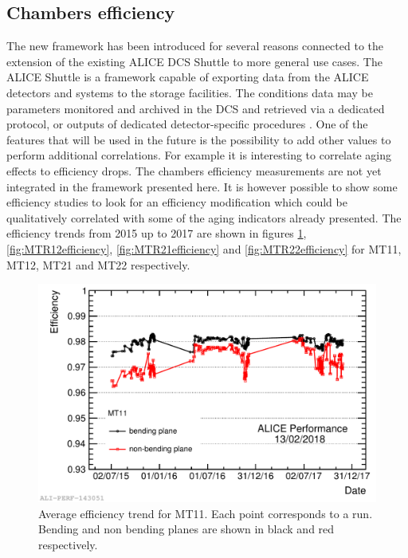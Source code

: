 \subsection{Chambers efficiency}
The new framework has been introduced for several reasons connected to the extension of the existing ALICE DCS Shuttle to more general use cases.
The ALICE Shuttle is a framework capable of exporting data from the ALICE detectors and systems to the storage facilities.
The conditions data may be parameters monitored and archived in the DCS and retrieved via a dedicated protocol, or outputs of dedicated detector-specific procedures \cite{aliceshuttle}.
One of the features that will be used in the future is the possibility to add other values to perform additional correlations.
For example it is interesting to correlate aging effects to efficiency drops.
The chambers efficiency measurements are not yet integrated in the framework presented here.
It is however possible to show some efficiency studies to look for an efficiency modification which could be qualitatively correlated with some of the aging indicators already presented.
The efficiency trends from 2015 up to 2017 are shown in figures \ref{fig:MTR11efficiency}, \ref{fig:MTR12efficiency}, \ref{fig:MTR21efficiency} and \ref{fig:MTR22efficiency} for MT11, MT12, MT21 and MT22 respectively.

\begin{figure}[!ht]
\begin{center}
\includegraphics[width=0.8\linewidth]{Chapters/Performance/Figs/2018-Feb-16-effTrend_2015-2017_Ch11.pdf}
\caption{Average efficiency trend for MT11. Each point corresponds to a run. Bending and non bending planes are shown in black and red respectively.}
\label{fig:MTR11efficiency}
\end{center}
\end{figure}

